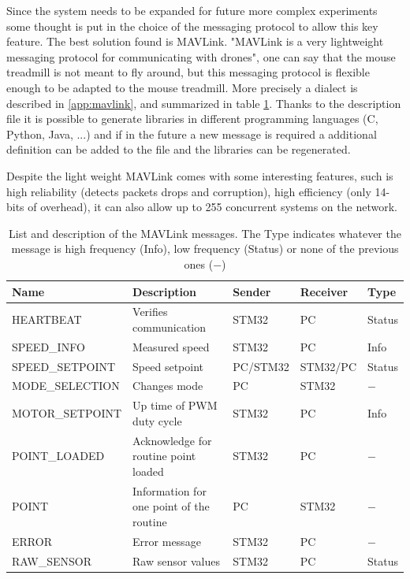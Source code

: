 \documentclass[12pt,a4paper, twoside]{article}
\begin{document}
Since the system needs to be expanded for future more complex experiments some thought is put in the choice of the messaging protocol to allow this key feature.
The best solution found is MAVLink. "MAVLink is a very lightweight messaging protocol for communicating with drones"\cite{mavlink}, one can say that the mouse treadmill is not meant to fly around, but this messaging protocol is flexible enough to be adapted to the mouse treadmill.
More precisely a dialect is described in \ref{app:mavlink}, and summarized in table \ref{tab:msg}. Thanks to the description file it is possible to generate libraries in different programming languages (C, Python, Java, ...) and if in the future a new message is required a additional definition can be added to the file and the libraries can be regenerated.

Despite the light weight MAVLink comes with some interesting features, such is high reliability (detects packets drops and corruption), high efficiency (only 14-bits of overhead), it can also allow up to 255 concurrent systems on the network.

\begin{table}[H]
	\centering
	\begin{tabular}{l||p{3cm}|l|l|l} 
		\textbf{Name} &\textbf{Description} &\textbf{Sender} &\textbf{Receiver} & \textbf{Type}\\ 
		\hline
		\hline 
		HEARTBEAT &Verifies communication& STM32 & PC & Status \\ 
		\hline 
		SPEED\_INFO &Measured speed  & STM32 & PC & Info \\ 
		\hline 
		SPEED\_SETPOINT & Speed setpoint & PC/STM32 & STM32/PC & Status\\ 
		\hline 
		MODE\_SELECTION & Changes mode & PC & STM32 & $-$\\ 
		\hline 
		MOTOR\_SETPOINT & Up time of PWM duty cycle & STM32 & PC & Info  \\ 
		\hline 
		POINT\_LOADED & Acknowledge for routine point loaded  & STM32 & PC & $-$ \\ 
		\hline 
		POINT & Information for one point of the routine  & PC & STM32 & $-$  \\  
		\hline 
		ERROR & Error message & STM32 & PC & $-$  \\
		\hline
		RAW\_SENSOR & Raw sensor values & STM32 & PC & Status\\
	\end{tabular} 
	\caption{List and description of the MAVLink messages. The Type indicates whatever the message is high frequency (Info), low frequency (Status) or none of the previous ones ($-$)}
	\label{tab:msg}
\end{table}
\end{document}

